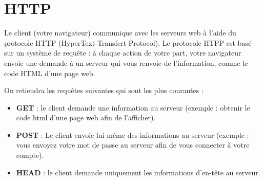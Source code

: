 \documentclass{article}
\begin{document}
\section{HTTP}
\label{http}
\begin{tcolorbox}
Le client (votre navigateur) communique avec les serveurs web à l'aide du protocole HTTP (HyperText Transfert Protocol). Le protocole HTPP est basé sur un système de requête : à chaque action de votre part, votre navigateur envoie une demande à un serveur qui vous renvoie de l'information, comme le code HTML d'une page web.

On retiendra les requêtes suivantes qui sont les plus courantes :
\begin{itemize}
\item \textbf{GET} : le client demande une information au serveur (exemple : obtenir le code html d'une page web afin de l'afficher).
\item \textbf{POST} : Le client envoie lui-même des informations au serveur (exemple : vous envoyez votre mot de passe au serveur afin de vous connecter à votre compte).
\item \textbf{HEAD} : le client demande uniquement les informations d'en-tête au serveur.
\end{itemize}
\end{tcolorbox}
\end{document}
